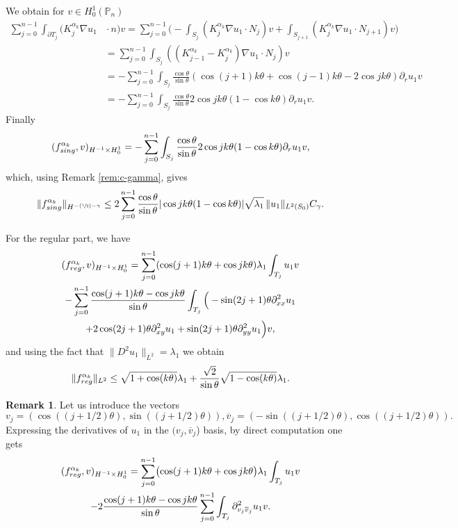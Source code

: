 \documentclass[11pt]{article}
\numberwithin{equation}{section}\newtheorem*{jepEnonce}{\jepEnonceTitle}\newenvironment{enonce*}[1]{\def\jepEnonceTitle{#1}\jepEnonce}{\endjepEnonce}\newtheorem*{conj*}{Conjecture}
\newcommand{\Psfrac}[2]{(\sfrac{#1}{#2})}
\theoremstyle{plain}
\theoremstyle{definition}
\newtheorem{rem}[thm]{Remark}
\newcommand{\reg}{\textup{reg}}
\newcommand{\sing}{\textup{sing}}
\def\Pp{{\mathbb{P}_n}}
\newcommand{\lb}{\lambda}
\let\jepOriginalSfrac\sfrac
\renewcommand{\sfrac}[2]{{\jepOriginalSfrac{#1}{#2}}}
\begin{document}
We obtain for $v \in H_0^1(\Pp)$
\begin{align*}
\sum_{j=0}^{n-1} \int_{\partial T_j} (K_j^{\alpha_k}\nabla u_1 &{}\cdot n) v = \sum_{j=0}^{n-1}\biggl(- \int_{S_j} (K_j^{\alpha_k}\nabla u_1 \cdot N_j) v
+\int_{S_{j+1}} (K_j^{\alpha_k}\nabla u_1 \cdot N_{j+1})v
\biggr) \\
&= \sum_{j=0}^{n-1} \int_{S_j}((K_{j-1}^{\alpha_k}-K_j^{\alpha_k})\nabla u_1 \cdot N_j) v
\\
&= -\sum_{j=0}^{n-1}\int_{S_j} \frac{\cos \theta}{\sin \theta} (\cos (j+1)k\theta+\cos (j-1)k\theta - 2 \cos jk\theta) \partial_r u_1 v \\
&= -\sum_{j=0}^{n-1}\int_{S_j} \frac{\cos \theta}{\sin \theta} 2 \cos jk\theta(1-\cos k \theta) \partial_r u_1 v.
\end{align*}
Finally
\[
(f_{\sing}^{\alpha_k}, v)_{H^{-1}\times H^1_0} = -\sum_{j=0}^{n-1}\int_{S_j} \frac{\cos \theta}{\sin \theta} 2 \cos jk\theta(1-\cos k \theta) \partial_r u_1 v,
\]
which, using Remark \ref{rem:c-gamma}, gives
\[
\|f_{\sing}^{\alpha_k}\|_{H^{-\Psfrac 12-\gamma}}\le 2\sum_{j=0}^{n-1} \frac{\cos \theta}{\sin \theta} | \cos jk\theta(1-\cos k \theta)| \sqrt{\lb_1}\,\|u_1\|_{L^2(S_0)} C_\gamma.
\]

For the regular part, we have\vspace*{-5pt}
\begin{multline*}(f_{\reg}^{\alpha_k}, v)_{H^{-1}\times H^1_0}= \sum_{j=0}^{n-1} (\cos (j+1)k\theta+\cos jk\theta) \lb_1 \int_{T_j} u_1v\\
- \sum_{j=0}^{n-1} {\frac{\cos(j+1)k\theta-\cos jk\theta}{\sin \theta}} \int_{T_j} \Big (-\sin (2j+1)\theta \partial^2_{xx}u_1 \\
+ 2 \cos (2j+1)\theta \partial^2_{xy} u_1+ \sin(2j+1)\theta \partial^2_{yy} u_1\Big)v,
\end{multline*}
and using the fact that $\|D^2 u_1\|_{L^2} = \lambda_1$ we obtain
\[
\|f^{\alpha_k}_{\reg}\|_{L^2}\le \sqrt{1+\cos (k \theta)} \lb_1 +\frac{\sqrt{2}}{\sin \theta} \sqrt{1- \cos (k \theta)}\lb_1 .
\]

\begin{rem}
Let us introduce the vectors
\[
v_j=(\cos((j+1/2)\theta), \sin ((j+1/2)\theta)), \overline v_j= (-\sin((j+1/2)\theta), \cos ((j+1/2)\theta)).
\]
Expressing the derivatives of $u_1$ in the $(v_j, \overline v_j$) basis, by direct computation one gets\vspace*{-5pt}
\begin{multline*}
(f_{\reg}^{\alpha_k}, v)_{H^{-1}\times H^1_0}
=\sum_{j=0}^{n-1} \bigl(\cos (j+1)k\theta+\cos jk\theta\bigr) \lb_1 \int_{T_j} u_1v\\
-2 \frac{\cos(j+1)k\theta-\cos jk\theta}{\sin \theta} \sum_{j=0}^{n-1} \int_{T_j} \partial^2_{v_j\overline v_j}u_1 v.
\end{multline*}
\label{rem:reg-part-change-basis}
\end{rem}
\end{document}

